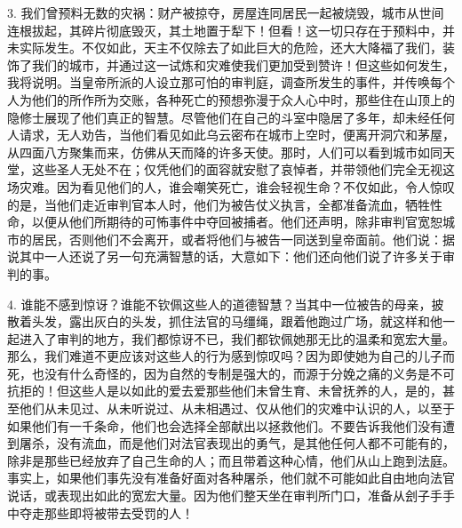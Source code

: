 3. 我们曾预料无数的灾祸：财产被掠夺，房屋连同居民一起被烧毁，城市从世间连根拔起，其碎片彻底毁灭，其土地置于犁下！但看！这一切只存在于预料中，并未实际发生。不仅如此，天主不仅除去了如此巨大的危险，还大大降福了我们，装饰了我们的城市，并通过这一试炼和灾难使我们更加受到赞许！但这些如何发生，我将说明。当皇帝所派的人设立那可怕的审判庭，调查所发生的事件，并传唤每个人为他们的所作所为交账，各种死亡的预想弥漫于众人心中时，那些住在山顶上的隐修士展现了他们真正的智慧。尽管他们在自己的斗室中隐居了多年，却未经任何人请求，无人劝告，当他们看见如此乌云密布在城市上空时，便离开洞穴和茅屋，从四面八方聚集而来，仿佛从天而降的许多天使。那时，人们可以看到城市如同天堂，这些圣人无处不在；仅凭他们的面容就安慰了哀悼者，并带领他们完全无视这场灾难。因为看见他们的人，谁会嘲笑死亡，谁会轻视生命？不仅如此，令人惊叹的是，当他们走近审判官本人时，他们为被告仗义执言，全都准备流血，牺牲性命，以便从他们所期待的可怖事件中夺回被捕者。他们还声明，除非审判官宽恕城市的居民，否则他们不会离开，或者将他们与被告一同送到皇帝面前。他们说：据说其中一人还说了另一句充满智慧的话，大意如下：他们还向他们说了许多关于审判的事。\par

4. 谁能不感到惊讶？谁能不钦佩这些人的道德智慧？当其中一位被告的母亲，披散着头发，露出灰白的头发，抓住法官的马缰绳，跟着他跑过广场，就这样和他一起进入了审判的地方，我们都惊讶不已，我们都钦佩她那无比的温柔和宽宏大量。那么，我们难道不更应该对这些人的行为感到惊叹吗？因为即使她为自己的儿子而死，也没有什么奇怪的，因为自然的专制是强大的，而源于分娩之痛的义务是不可抗拒的！但这些人是以如此的爱去爱那些他们未曾生育、未曾抚养的人，是的，甚至他们从未见过、从未听说过、从未相遇过、仅从他们的灾难中认识的人，以至于如果他们有一千条命，他们也会选择全部献出以拯救他们。不要告诉我他们没有遭到屠杀，没有流血，而是他们对法官表现出的勇气，是其他任何人都不可能有的，除非是那些已经放弃了自己生命的人；而且带着这种心情，他们从山上跑到法庭。事实上，如果他们事先没有准备好面对各种屠杀，他们就不可能如此自由地向法官说话，或表现出如此的宽宏大量。因为他们整天坐在审判所门口，准备从刽子手手中夺走那些即将被带去受罚的人！\par

